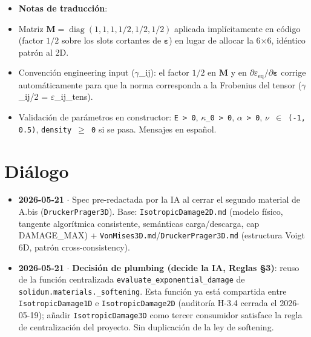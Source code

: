 \documentclass[11pt,letterpaper,oneside]{report}
\begin{document}
\begin{itemize}
  \item \textbf{Notas de traducción}:
  \item Matriz $\mathbf M = \operatorname{diag}(1, 1, 1, 1/2, 1/2, 1/2)$ aplicada implícitamente en código (factor $1/2$ sobre los slots cortantes de $\boldsymbol\varepsilon$) en lugar de allocar la 6\ensuremath{\times}6, idéntico patrón al 2D.
  \item Convención engineering input (\ensuremath{\gamma}\_ij): el factor $1/2$ en $\mathbf M$ y en $\partial\varepsilon_\text{eq}/\partial\boldsymbol\varepsilon$ corrige automáticamente para que la norma corresponda a la Frobenius del tensor (\ensuremath{\gamma}\_ij/2 = \ensuremath{\varepsilon}\_ij\_tens).
  \item Validación de parámetros en constructor: \texttt{E > 0}, \texttt{\ensuremath{\kappa}\_0 > 0}, \texttt{\ensuremath{\alpha} > 0}, \texttt{\ensuremath{\nu} \ensuremath{\in} (-1, 0.5)}, \texttt{density \ensuremath{\ge} 0} si se pasa. Mensajes en español.
\end{itemize}


\section{Diálogo}

\begin{itemize}
  \item \textbf{2026-05-21} \ensuremath{\cdot} Spec pre-redactada por la IA al cerrar el segundo material de A.bis (\texttt{DruckerPrager3D}). Base: \texttt{IsotropicDamage2D.md} (modelo físico, tangente algorítmica consistente, semánticas carga/descarga, cap DAMAGE\_MAX) + \texttt{VonMises3D.md}/\texttt{DruckerPrager3D.md} (estructura Voigt 6D, patrón cross-consistency).
\end{itemize}

\begin{itemize}
  \item \textbf{2026-05-21} \ensuremath{\cdot} \textbf{Decisión de plumbing (decide la IA, Reglas §3)}: reuso de la función centralizada \texttt{evaluate\_exponential\_damage} de \texttt{solidum.materials.\_softening}. Esta función ya está compartida entre \texttt{IsotropicDamage1D} e \texttt{IsotropicDamage2D} (auditoría H-3.4 cerrada el 2026-05-19); añadir \texttt{IsotropicDamage3D} como tercer consumidor satisface la regla de centralización del proyecto. Sin duplicación de la ley de softening.
\end{itemize}
\end{document}
